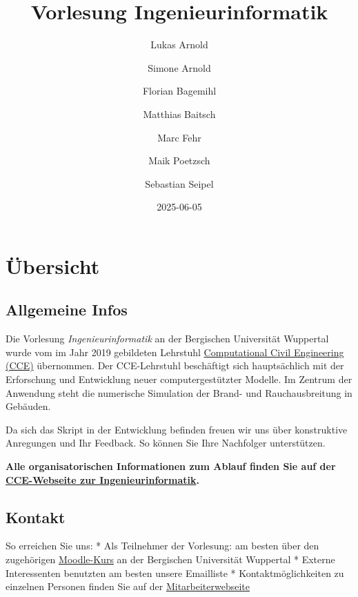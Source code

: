 \documentclass[
  letterpaper,
  DIV=11,
  numbers=noendperiod]{scrreprt}
\title{Vorlesung Ingenieurinformatik}
\author{Lukas Arnold \and Simone Arnold \and Florian
Bagemihl \and Matthias Baitsch \and Marc Fehr \and Maik
Poetzsch \and Sebastian Seipel}
\date{2025-06-05}
\renewcommand*\contentsname{Table of contents}
\newcommand\contentsname{Table of contents}
\begin{document}
\maketitle

\renewcommand*\contentsname{Table of contents}
{
\hypersetup{linkcolor=}
\setcounter{tocdepth}{2}
\tableofcontents
}


\chapter*{Übersicht}\label{uxfcbersicht}


\section*{Allgemeine Infos}\label{allgemeine-infos}


Die Vorlesung \emph{Ingenieurinformatik} an der Bergischen Universität
Wuppertal wurde vom im Jahr 2019 gebildeten Lehrstuhl
\href{https://cce.uni-wuppertal.de/}{Computational Civil Engineering
(CCE)} übernommen. Der CCE-Lehrstuhl beschäftigt sich hauptsächlich mit
der Erforschung und Entwicklung neuer computergestützter Modelle. Im
Zentrum der Anwendung steht die numerische Simulation der Brand- und
Rauchausbreitung in Gebäuden.

Da sich das Skript in der Entwicklung befinden freuen wir uns über
konstruktive Anregungen und Ihr Feedback. So können Sie Ihre Nachfolger
unterstützen.

\textbf{Alle organisatorischen Informationen zum Ablauf finden Sie auf
der
\href{https://cce.uni-wuppertal.de/index.php?id=4178&L=0}{CCE-Webseite
zur Ingenieurinformatik}.}

\section*{Kontakt}\label{kontakt}


So erreichen Sie uns: * Als Teilnehmer der Vorlesung: am besten über den
zugehörigen
\href{https://moodle.uni-wuppertal.de/course/view.php?id=46894}{Moodle-Kurs}
an der Bergischen Universität Wuppertal * Externe Interessenten
benutzten am besten unsere Emailliste * Kontaktmöglichkeiten zu
einzelnen Personen finden Sie auf der
\href{https://cce.uni-wuppertal.de/de/team/}{Mitarbeiterwebseite}
\end{document}
